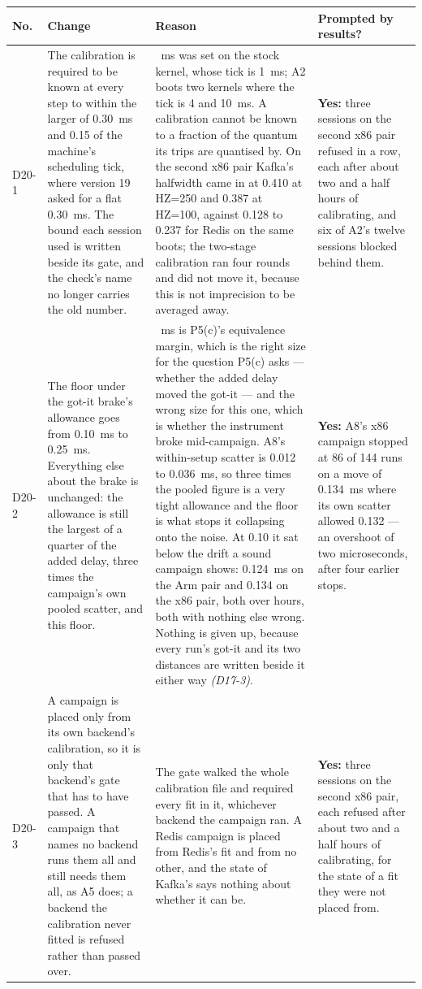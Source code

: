 \documentclass[11pt]{article}
\newcommand{\gl}[1]{{\color{soft}\itshape\small (#1)}}
\begin{document}
{\small
\begin{longtable}{@{}p{1.1cm} >{\raggedright\arraybackslash}p{6.1cm} >{\raggedright\arraybackslash}p{6.0cm} >{\raggedright\arraybackslash}p{2.2cm}@{}}
\toprule
\textbf{No.} & \textbf{Change} & \textbf{Reason} & \textbf{Prompted by results?} \\
\midrule
\endhead
D20-1 & The calibration is required to be known at every step to within the larger of 0.30~ms and 0.15 of the machine's scheduling tick, where version 19 asked for a flat 0.30~ms. The bound each session used is written beside its gate, and the check's name no longer carries the old number. & 0.30~ms was set on the stock kernel, whose tick is 1~ms; A2 boots two kernels where the tick is 4 and 10~ms. A calibration cannot be known to a fraction of the quantum its trips are quantised by. On the second x86 pair Kafka's halfwidth came in at 0.410 at HZ=250 and 0.387 at HZ=100, against 0.128 to 0.237 for Redis on the same boots; the two-stage calibration ran four rounds and did not move it, because this is not imprecision to be averaged away. & \textbf{Yes:} three sessions on the second x86 pair refused in a row, each after about two and a half hours of calibrating, and six of A2's twelve sessions blocked behind them. \\
D20-2 & The floor under the got-it brake's allowance goes from 0.10~ms to 0.25~ms. Everything else about the brake is unchanged: the allowance is still the largest of a quarter of the added delay, three times the campaign's own pooled scatter, and this floor. & 0.10~ms is P5(c)'s equivalence margin, which is the right size for the question P5(c) asks --- whether the added delay moved the got-it --- and the wrong size for this one, which is whether the instrument broke mid-campaign. A8's within-setup scatter is 0.012 to 0.036~ms, so three times the pooled figure is a very tight allowance and the floor is what stops it collapsing onto the noise. At 0.10 it sat below the drift a sound campaign shows: 0.124~ms on the Arm pair and 0.134 on the x86 pair, both over hours, both with nothing else wrong. Nothing is given up, because every run's got-it and its two distances are written beside it either way \gl{D17-3}. & \textbf{Yes:} A8's x86 campaign stopped at 86 of 144 runs on a move of 0.134~ms where its own scatter allowed 0.132 --- an overshoot of two microseconds, after four earlier stops. \\
D20-3 & A campaign is placed only from its own backend's calibration, so it is only that backend's gate that has to have passed. A campaign that names no backend runs them all and still needs them all, as A5 does; a backend the calibration never fitted is refused rather than passed over. & The gate walked the whole calibration file and required every fit in it, whichever backend the campaign ran. A Redis campaign is placed from Redis's fit and from no other, and the state of Kafka's says nothing about whether it can be. & \textbf{Yes:} three sessions on the second x86 pair, each refused after about two and a half hours of calibrating, for the state of a fit they were not placed from. \\
\bottomrule
\end{longtable}}
\end{document}
